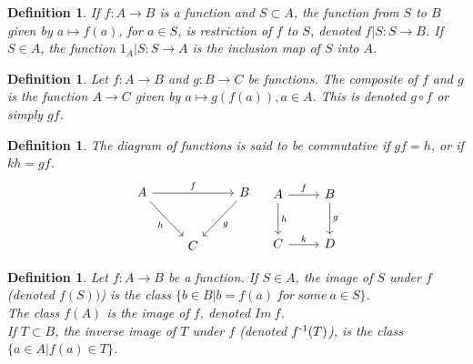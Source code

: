 \documentclass[a4paper,sfsidenotes,openany]{tufte-book}
\theoremstyle{theorem}
\newtheorem{definition}[theorem]{Definition}
\begin{document}
\begin{fullwidth}
\begin{definition}
If $ f: A \rightarrow B $ is a function and $ S \subset A$, the function from $ S $ to $ B $ given by $ a \mapsto f(a) $, for $ a \in S $, is \textit{{\color{blue} restriction}} of $ f $ to $ S $, denoted $ f|S: S \rightarrow B$.\newline
If $ S \in A$, the function $ 1_A | S: S \rightarrow A $ is the \textit{{\color{blue} inclusion map}} of $S$ into $A$.\\
\end{definition}
\>

\begin{definition}
Let $ f: A \rightarrow B $ and $ g: B \rightarrow C $ be functions. The \textit{{\color{blue} composite}} of $ f $ and $ g $ is the function $ A \rightarrow C $ given by $ a \mapsto g(f(a)), a \in A $. This is denoted $ g \circ f $ or simply $ gf $.\\
\end{definition}
\>

\begin{definition}
The \textit{{\color{blue} diagram of functions}} is said to be commutative if $ gf = h $, or if $ kh = gf $.\\

\begin{equation}\label{diagram}
\begin{tikzcd}
A \arrow{rr}{f} \arrow[swap]{dr}{h} & & B \arrow{dl}{g} \\[10pt]
    & C
\end{tikzcd}
\quad
\begin{tikzcd}[row sep=2.5em]
 A \ar{r}{f} \ar{d}{h} & B \ar{d}{g} \\
 C \ar{r}{k} & D
\end{tikzcd}
\end{equation}
\end{definition}
\>

\begin{definition}
Let $ f: A \rightarrow B $ be a function. If $ S \in A $, \textit{{\color{blue} the image of $ S $ under $ f $}} (denoted $ f(S)) $) is the class $ \{ b \in B | b=f(a) \ for \ some \ a \in S\} $.\\
The class $ f(A) $ is the \textit{{\color{blue} image of $ f $}}, denoted $ Im \ f $.\\
If $ T \subset B $, the \textit{{\color{blue} inverse image of $ T $}} under $ f $ (denoted $ f \textsuperscript{-1} (T) $), is the class $ \{ a \in A | f(a) \in T\} $.\\
\end{definition}
\>


\end{fullwidth}
\end{document}
